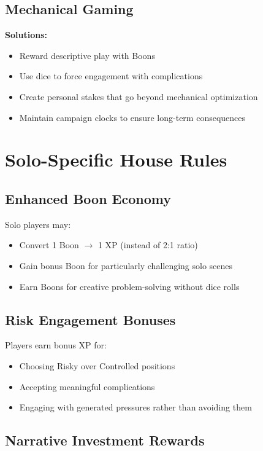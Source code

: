 \documentclass[11pt]{article}
\begin{document}
\subsection{Mechanical Gaming}

\begin{framed}
\textbf{Solutions:}
\begin{itemize}
    \item Reward descriptive play with Boons
    \item Use dice to force engagement with complications
    \item Create personal stakes that go beyond mechanical optimization
    \item Maintain campaign clocks to ensure long-term consequences
\end{itemize}
\end{framed}

\section{Solo-Specific House Rules}

\subsection{Enhanced Boon Economy}

Solo players may:
\begin{itemize}
    \item Convert 1 Boon $\rightarrow$ 1 XP (instead of 2:1 ratio)
    \item Gain bonus Boon for particularly challenging solo scenes
    \item Earn Boons for creative problem-solving without dice rolls
\end{itemize}

\subsection{Risk Engagement Bonuses}

Players earn bonus XP for:
\begin{itemize}
    \item Choosing Risky over Controlled positions
    \item Accepting meaningful complications
    \item Engaging with generated pressures rather than avoiding them
\end{itemize}

\subsection{Narrative Investment Rewards}
\end{document}
